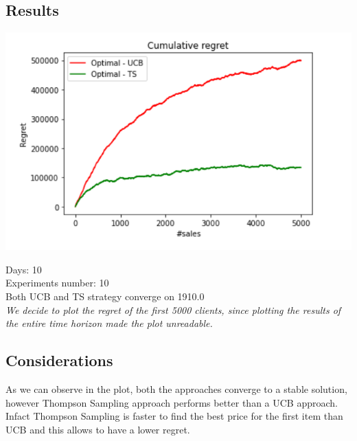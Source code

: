 \subsection*{Results}
\begin{center}
	\includegraphics[scale=1.2]{Images/n3}
\end{center}
Days: 10\\
Experiments number: 10 \\
Both UCB and TS strategy converge on 1910.0\\
\textit{We decide to plot the regret of the first 5000 clients, since plotting the results of the entire time horizon made the plot unreadable.}


\subsection*{Considerations}
As we can observe in the plot, both the approaches converge to a stable solution, however Thompson Sampling approach performs better than a UCB approach. Infact Thompson Sampling is faster to find the best price for the first item than UCB and this allows to have a lower regret. 